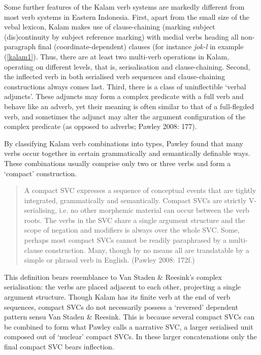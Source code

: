 Some further features of the Kalam verb systems are markedly different from most verb systems in Eastern Indonesia. First, apart from the small size of the vebal lexicon, Kalam makes use of clause-chaining (marking subject (dis)continuity by subject reference marking) with medial verbs heading all non-paragraph final (coordinate-dependent) clauses (for instance \textit{jok-l} in example (\ref{kalam1}). Thus, there are at least two multi-verb operations in Kalam, operating on different levels, that is, serisalisation and clause-chaining. Second, the inflected verb in both serialised verb sequences and clause-chaining constructions always comes last. Third, there is a class of uninflectible `verbal adjuncts'. These adjuncts may form a complex predicate with a full verb and behave like an adverb, yet their meaning is often similar to that of a full-flegded verb, and sometimes the adjunct may alter the argument configuration of the complex predicate (as opposed to adverbs; Pawley 2008: 177).

By classifying Kalam verb combinations into types, Pawley found that many verbs occur together in certain grammatically and semantically definable ways. These combinations usually comprise only two or three verbs and form a `compact' construction. 

\begin{quote}A compact SVC expresses a sequence of conceptual events that are tightly integrated, grammatically and semantically. Compact SVCs are strictly V-serialising, i.e. no other morphemic material can occur between the verb roots. The verbs in the SVC share a single argument structure and the scope of negation and modifiers is always over the whole SVC. Some, perhaps most compact SVCs cannot be readily paraphrased by a multi-clause construction. Many, though by no means all are translatable by a simple or phrasal verb in English. (Pawley 2008: 172f.)\end{quote}

This definition bears resemblance to Van Staden \& Reesink's complex serialisation: the verbs are placed adjacent to each other, projecting a single argument structure. Though Kalam has its finite verb at the end of verb sequences, compact SVCs do not necessarily possess a `reversed' dependent pattern sensu Van Staden \& Reesink. This is because several compact SVCs can be combined to form what Pawley calls a narrative SVC, a larger serialised unit composed out of `nuclear' compact SVCs. In these larger concatenations only the final compact SVC bears inflection.

